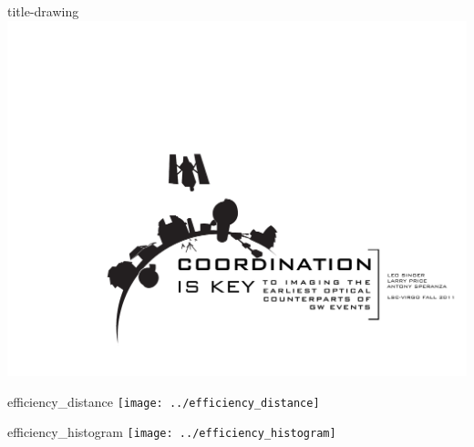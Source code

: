 \documentclass[portrait]{a0poster}
\begin{document}

\begin{staticcontents*}{title-drawing}
\includegraphics[width=\textwidth,clip=true,trim=0cm 5cm 0cm 0cm]{title-drawing.pdf}
\end{staticcontents*}

\begin{staticcontents*}{efficiency_distance}
\texttt{[image: ../efficiency\_distance]}
\end{staticcontents*}

\begin{staticcontents*}{efficiency_histogram}
\texttt{[image: ../efficiency\_histogram]}
\end{staticcontents*}
\end{document}
